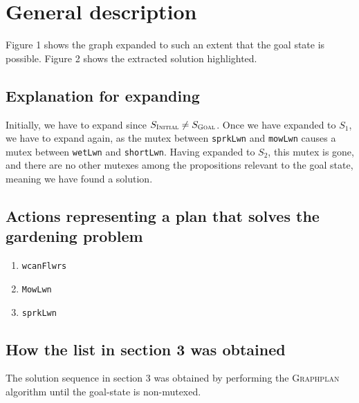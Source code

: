 \section*{General description}


Figure 1 shows the graph expanded to such an extent that the goal state is possible.
Figure 2 shows the extracted solution highlighted.

\subsection*{Explanation for expanding}

Initially, we have to expand since $S_{\textsc{Initial}} \neq S_{\textsc{Goal}}$.
Once we have expanded to $S_1$, we have to expand again, as the mutex between \texttt{sprkLwn} and \texttt{mowLwn} causes a mutex between \texttt{wetLwn} and \texttt{shortLwn}. Having expanded to $S_2$, this mutex is gone, and there are no other mutexes among the propositions relevant to the goal state, meaning we have found a solution.

\subsection*{Actions representing a plan that solves the gardening problem}

\begin{enumerate}
    \item \texttt{wcanFlwrs}
    \item \texttt{MowLwn}
    \item \texttt{sprkLwn}
\end{enumerate}

\subsection*{How the list in section 3 was obtained}

The solution sequence in section 3 was obtained by performing the \textsc{Graphplan} algorithm until the goal-state is non-mutexed.


